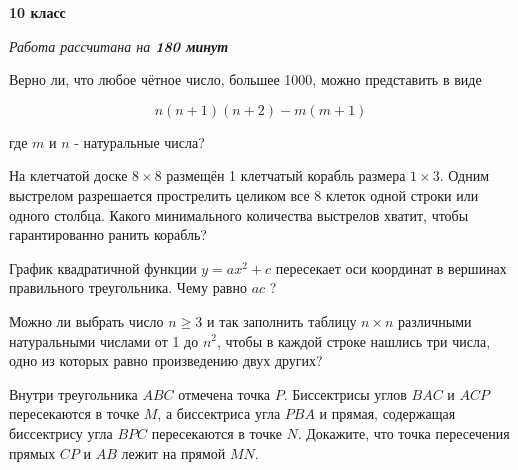 \centerline{\bf \huge 10 класс}
\centerline{\normalsize{\it Работа рассчитана на \bf{180} минут}}

Верно ли, что любое чётное число, большее 1000, можно представить в виде

$$
n(n+1)(n+2)-m(m+1)
$$


где $m$ и $n$ - натуральные числа?

На клетчатой доске $8 \times 8$ размещён 1 клетчатый корабль размера $1 \times 3$. Одним выстрелом разрешается прострелить целиком все 8 клеток одной строки или одного столбца. Какого минимального количества выстрелов хватит, чтобы гарантированно ранить корабль?

График квадратичной функции $y=a x^2+c$ пересекает оси координат в вершинах правильного треугольника. Чему равно $a c$ ?

Можно ли выбрать число $n \geqslant 3$ и так заполнить таблицу $n \times n$ различными натуральными числами от 1 до $n^2$, чтобы в каждой строке нашлись три числа, одно из которых равно произведению двух других?

Внутри треугольника $A B C$ отмечена точка $P$. Биссектрисы углов $B A C$ и $A C P$ пересекаются в точке $M$, а биссектриса угла $P B A$ и прямая, содержащая биссектрису угла $B P C$ пересекаются в точке $N$. Докажите, что точка пересечения прямых $C P$ и $A B$ лежит на прямой $MN$.